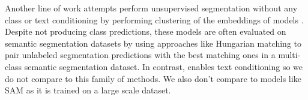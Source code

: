 Another line of work attempts perform unsupervised segmentation without any class or text conditioning by performing clustering of the embeddings of models \cite{cho_picie_2021, hamilton_unsupervised_2022, tian_diffuse_2024}. Despite not producing class predictions, these models are often evaluated on semantic segmentation datasets by using approaches like Hungarian matching \cite{kuhn_hungarian_1955} to pair unlabeled segmentation predictions with the best matching ones in a multi-class semantic segmentation dataset. In contrast, \tool{} enables text conditioning so we do not compare to this family of methods. We also don't compare to models like SAM \cite{kirillov_segment_2023, ravi_sam_2024} as it is trained on a large scale dataset. 